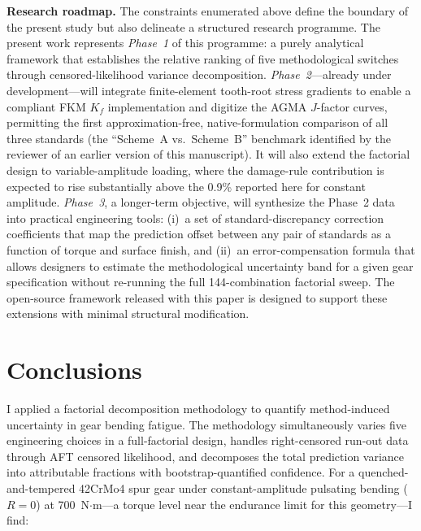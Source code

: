 \documentclass[12pt,a4paper]{article}
\begin{document}
\medskip
\noindent\textbf{Research roadmap.}
The constraints enumerated above define the boundary of the present
study but also delineate a structured research programme. The present
work represents \emph{Phase~1} of this programme: a purely analytical
framework that establishes the relative ranking of five
methodological switches through censored-likelihood variance
decomposition. \emph{Phase~2}---already under development---will
integrate finite-element tooth-root stress gradients to enable a
compliant FKM $K_f$ implementation and digitize the AGMA $J$-factor
curves, permitting the first approximation-free, native-formulation
comparison of all three standards (the ``Scheme~A vs.\ Scheme~B''
benchmark identified by the reviewer of an earlier version of this
manuscript). It will also extend the factorial design to
variable-amplitude loading, where the damage-rule contribution is
expected to rise substantially above the 0.9\% reported here for
constant amplitude. \emph{Phase~3}, a longer-term objective, will
synthesize the Phase~2 data into practical engineering tools: (i)~a
set of standard-discrepancy correction coefficients that map the
prediction offset between any pair of standards as a function of
torque and surface finish, and (ii)~an error-compensation formula
that allows designers to estimate the methodological uncertainty
band for a given gear specification without re-running the full
144-combination factorial sweep. The open-source framework released
with this paper is designed to support these extensions with
minimal structural modification.

\section{Conclusions}
\label{sec:conclusions}

I applied a factorial decomposition methodology to quantify
method-induced uncertainty in gear bending fatigue. The methodology
simultaneously varies five engineering choices in a full-factorial
design, handles right-censored run-out data through AFT censored
likelihood, and decomposes the total prediction variance into
attributable fractions with bootstrap-quantified confidence. For a
quenched-and-tempered 42CrMo4 spur gear under constant-amplitude
pulsating bending ($R=0$) at 700~N$\cdot$m---a torque level near the
endurance limit for this geometry---I find:
\end{document}
